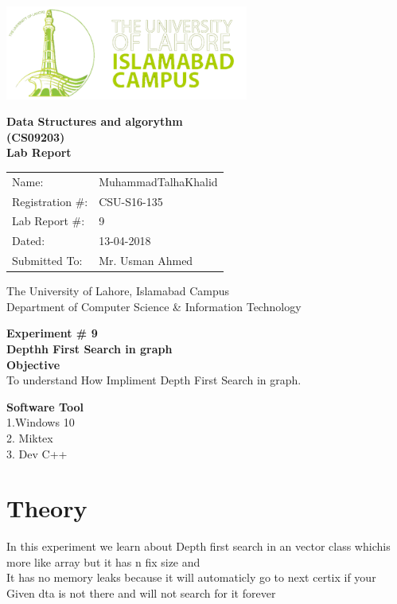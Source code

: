 \documentclass[11pt]{article}            %
\begin{document}
\begin{titlepage}
    \centering
  \vfill
    \includegraphics[width=8cm]{uni_logo.png} \\ 
	\vskip2cm
    {\bfseries\Large
	Data Structures and algorythm  \\ (CS09203)\\
	
	\vskip2cm
	Lab Report 
	 
	\vskip2cm
	}    

\begin{center}
\begin{tabular}{ l l  } 

Name: & MuhammadTalhaKhalid \\ 
Registration \#: &CSU-S16-135\\ 
Lab Report \#: & 9 \\ 
 Dated:& 13-04-2018\\ 
Submitted To:& Mr. Usman Ahmed\\ 

\end{tabular}
\end{center}
    \vfill
    The University of Lahore, Islamabad Campus\\
Department of Computer Science \& Information Technology
\end{titlepage}


    
    {\bfseries\Large
\centering
	Experiment \# 9\\

Depthh First Search in graph\\
	
	}    
 \vskip1cm
 \textbf {Objective}\\  To understand How Impliment  Depth  First Search in graph.
 
 \textbf {Software Tool} \\
1.Windows 10 \\
2. Miktex\\
3. Dev C++\\

\section{Theory }              
In this experiment we learn about Depth first search in an vector class whichis more like array but it has n fix size and  \\
It has no memory leaks because it will automaticly go to next certix if your Given dta is not there and will not search for it forever\\ \\
\end{document}
